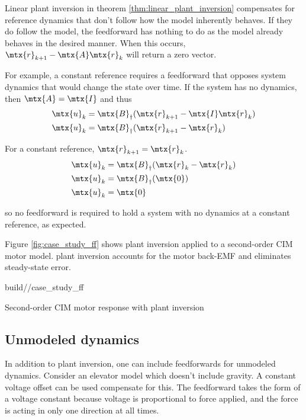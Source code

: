 Linear \gls{plant} inversion in theorem \ref{thm:linear_plant_inversion}
compensates for \gls{reference} dynamics that don't follow how the \gls{model}
inherently behaves. If they do follow the \gls{model}, the feedforward has
nothing to do as the \gls{model} already behaves in the desired manner. When
this occurs, $\mtx{r}_{k+1} - \mtx{A}\mtx{r}_k$ will return a zero vector.

For example, a constant \gls{reference} requires a feedforward that opposes
\gls{system} dynamics that would change the \gls{state} over time. If the
\gls{system} has no dynamics, then $\mtx{A} = \mtx{I}$ and thus
\begin{align*}
  \mtx{u}_k &= \mtx{B}_\dagger (\mtx{r}_{k+1} - \mtx{I}\mtx{r}_k) \\
  \mtx{u}_k &= \mtx{B}_\dagger (\mtx{r}_{k+1} - \mtx{r}_k)
\end{align*}

For a constant \gls{reference}, $\mtx{r}_{k+1} = \mtx{r}_k$.
\begin{align*}
  \mtx{u}_k &= \mtx{B}_\dagger (\mtx{r}_k - \mtx{r}_k) \\
  \mtx{u}_k &= \mtx{B}_\dagger (\mtx{0}) \\
  \mtx{u}_k &= \mtx{0}
\end{align*}

so no feedforward is required to hold a \gls{system} with no dynamics at a
constant \gls{reference}, as expected.

Figure \ref{fig:case_study_ff} shows \gls{plant} inversion applied to a
second-order CIM motor model. \Gls{plant} inversion accounts for the motor
back-EMF and eliminates steady-state error.

\begin{svg}{build/\chapterpath/case_study_ff}
  \caption{Second-order CIM motor response with plant inversion}
  \label{fig:case_study_ff}
\end{svg}

\subsection{Unmodeled dynamics}

In addition to \gls{plant} inversion, one can include feedforwards for unmodeled
dynamics. Consider an elevator model which doesn't include gravity. A constant
voltage offset can be used compensate for this. The feedforward takes the form
of a voltage constant because voltage is proportional to force applied, and the
force is acting in only one direction at all times.

